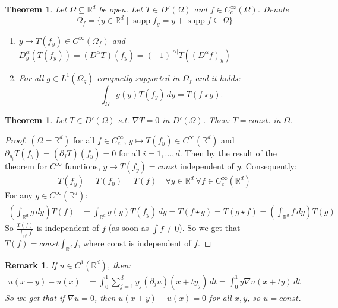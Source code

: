 \documentclass{report}
\theoremstyle{tommy}
\newtheorem{thm}[defn]{Theorem}
\newtheorem{rem}[defn]{Remark}
\newcommand{\supp}{\operatorname{supp}}
\begin{document}
  \begin{thm}
    Let \(\Omega \subseteq \mathbb{R}^d\) be open. Let \(T \in D'(\Omega)\) and \(f \in C_c^\infty(\Omega)\). Denote
    \[\Omega_f = \{y \in \mathbb{R}^d \mid \supp f_y = y + \supp f \subseteq \Omega\}\]
    \begin{enumerate}[label=\alph*)]
      \item \(y \mapsto T(f_y) \in C^\infty(\Omega_f)\) and \(D_y^\alpha(T(f_y)) = (D^\alpha T)(f_y) = (-1)^{|\alpha|}T((D^\alpha f)_y)\)
      \item For all \(g \in L^1(\Omega_g)\) compactly supported in \(\Omega_f\) and it holds:
      \[\int_\Omega g(y) T(f_y) \, dy = T(f \star g).\]
    \end{enumerate}
  \end{thm}
  
  \begin{thm}
    Let \(T \in D'(\Omega)\) s.t. \(\nabla T = 0\) in \(D'(\Omega)\). Then: \(T = const.\) in \(\Omega\).
  \end{thm}

  \begin{proof}
    \((\Omega = \mathbb{R}^d)\) for all \(f \in C_c^\infty\), \(y \mapsto T(f_y) \in C^\infty(\mathbb{R}^d)\) and \(\partial_{y_i} T(f_y) = (\partial_j T)(f_y) = 0\) for all \(i = 1, \dots, d\). Then by the result of the theorem for \(C^\infty\) functions,
    \(y \mapsto T(f_y) = const\) independent of \(y\). Consequently:
    \begin{align*}
      T(f_y) = T(f_0) = T(f) \quad \forall y \in \mathbb{R}^d \ \forall f \in C_c^\infty(\mathbb{R}^d)
    \end{align*}
    For any \(g \in C^\infty(\mathbb{R}^d)\):
    \begin{align*}
      \left(\int_{\mathbb{R}^d} g \, dy\right) T(f)
      &= \int_{\mathbb{R}^d} g(y) T(f_y) \, dy
      = T(f \star g)
      = T(g \star f)
      = \left(\int_{\mathbb{R}^d} f \, dy\right) T(g)
    \end{align*}
    So \(\frac{T(f)}{\int_{\mathbb{R}^d}f}\) is independent of \(f\) (as soon as \(\int f \ne 0\)). So we get that \(T(f) = const \int_{\mathbb{R}^d} f\), where const is independent of \(f\).
  \end{proof}
  
  \begin{rem}
    If \(u \in C^1(\mathbb{R}^d)\), then:
      \begin{align*}
        u(x+y) - u(x) 
        &= \int_0^1 \sum_{j=1}^d y_j (\partial_j u)(x + ty_j) \, dt
        = \int_0^1 y \nabla u(x+ty) \, dt
      \end{align*}
      So we get that if \(\nabla u = 0\), then \(u(x+y) - u(x) = 0\) for all \(x,y\), so \(u = const.\)
  \end{rem}
\end{document}
